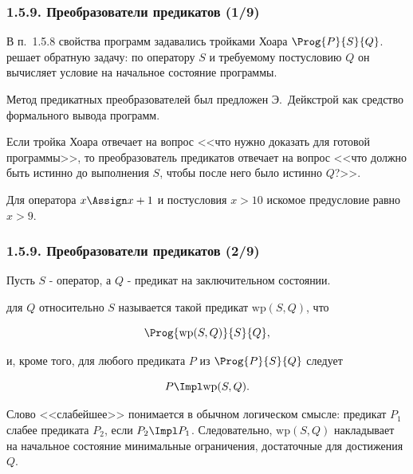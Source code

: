 
\begin{frame}
\frametitle{1.5.9. Преобразователи предикатов (1/9)}

В п.~1.5.8 свойства программ задавались тройками Хоара
$\Prog{P}{S}{Q}$.
решает обратную задачу:
по оператору $S$ и требуемому постусловию $Q$
он вычисляет условие на начальное состояние программы.

\smallskip
Метод предикатных преобразователей был предложен
Э.~Дейкстрой как средство формального вывода программ.

\begin{remark}
Если тройка Хоара отвечает на вопрос
<<что нужно доказать для готовой программы>>,
то преобразователь предикатов отвечает на вопрос
<<что должно быть истинно до выполнения $S$, чтобы после него было истинно $Q$?>>.
\end{remark}

\begin{example}
Для оператора $x \Assign x+1$ и постусловия $x>10$
искомое предусловие равно $x>9$.
\end{example}

\end{frame}

\begin{frame}
\frametitle{1.5.9. Преобразователи предикатов (2/9)}

Пусть $S$ - оператор, а $Q$ - предикат на заключительном состоянии.

\smallskip
{}
для $Q$ относительно $S$ называется такой предикат
$\mathrm{wp}(S,Q)$, что

\[
\Prog{\mathrm{wp}(S,Q)}{S}{Q},
\]

и, кроме того, для любого предиката $P$ из
$\Prog{P}{S}{Q}$ следует

\[
P \Impl \mathrm{wp}(S,Q).
\]

\begin{remark}
Слово <<слабейшее>> понимается в обычном логическом смысле:
предикат $P_1$ слабее предиката $P_2$, если $P_2 \Impl P_1$.
Следовательно, $\mathrm{wp}(S,Q)$ накладывает на начальное состояние
минимальные ограничения, достаточные для достижения $Q$.
\end{remark}

\end{frame}


